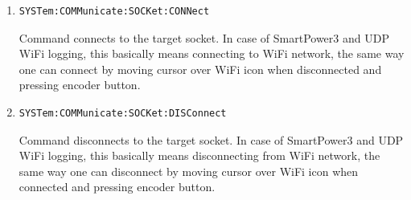 \documentclass[a4paper,10pt]{article}
\begin{document}
\begin{enumerate}
\begin{enumerate}
		\item
		    \begin{verbatim}SYSTem:COMMunicate:SOCKet:CONNect\end{verbatim}
		    \begin{description}
		        Command connects to the target socket. In case of SmartPower3 and UDP WiFi logging, this basically means connecting to WiFi network, the same way one can connect by moving cursor over WiFi icon when disconnected and pressing encoder button.
		    \end{description}
		\item 
		    \begin{verbatim}SYSTem:COMMunicate:SOCKet:DISConnect\end{verbatim}
		    \begin{description}
		        Command disconnects to the target socket. In case of SmartPower3 and UDP WiFi logging, this basically means disconnecting from WiFi network, the same way one can disconnect by moving cursor over WiFi icon when connected and pressing encoder button.
		    \end{description}


\end{enumerate}
\end{enumerate}
\end{document}
